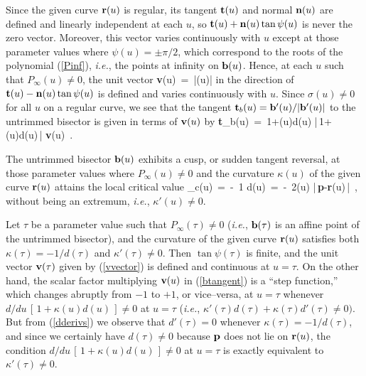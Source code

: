 Since the given curve ${\bf r}(u)$ is regular, its tangent ${\bf t}(u)$
and normal ${\bf n}(u)$ are defined and linearly independent at each $u$,
so ${\bf t}(u)+{\bf n}(u)\tan\psi(u)$ is never the zero vector. Moreover,
this vector varies continuously with $u$ except at those parameter values
where $\psi(u)=\pm\pi/2$, which correspond to the roots of the polynomial
(\ref{Pinf}), {\it i.e.}, the points at infinity on ${\bf b}(u)$. Hence,
at each $u$ such that $P_\infty(u)\not=0$, the unit vector
\be \label{vvector}
{\bf v}(u) \,=\, |\cos\psi(u)\;\!| 
\ee
in the direction of ${\bf t}(u)-{\bf n}(u)\tan\psi(u)$ is defined and
varies continuously with $u$. Since $\sigma(u)\not=0$ for all $u$ on
a regular curve, we see that the tangent ${\bf t}_b(u)={\bf b}'(u) /
|{\bf b}'(u)|$ to the untrimmed bisector is given in terms of ${\bf v}
(u)$ by
\be \label{btangent}
{\bf t}_b(u) \,=\,
{1+\kappa(u)d(u) \over |\,1+\kappa(u)d(u)\,|} \; {\bf v}(u) \,.
\ee

\begin{lma}
The untrimmed bisector ${\bf b}(u)$ exhibits a cusp, or sudden
tangent reversal, at those parameter values where $P_\infty(u)
\not=0$ and the curvature $\kappa(u)$ of the given curve ${\bf r}
(u)$ attains the local critical value
\be \label{kappacrit}
\kappa_c(u) \,=\, -\ {1 \over d(u)} \,=\,
-\ {2\cos\psi(u) \over |\,{\bf p}-{\bf r}(u)\,|} \,,
\ee
without being an extremum, {\it i.e.}, $\kappa'(u)\not=0$.
\end{lma}

\prf Let $\tau$ be a parameter value such that $P_\infty(\tau)\not
=0$ ({\it i.e.}, ${\bf b}(\tau)$ is an affine point of the untrimmed
bisector), and the curvature of the given curve ${\bf r}(u)$ satisfies
both $\kappa(\tau)=-1/d(\tau)$ and $\kappa'(\tau)\not=0$. Then $\tan
\psi(\tau)$ is finite, and the unit vector ${\bf v}(\tau)$ given by
(\ref{vvector}) is defined and continuous at $u=\tau$. On the other
hand, the scalar factor multiplying ${\bf v}(u)$ in (\ref{btangent})
is a ``step function,'' which changes abruptly from $-1$ to $+1$,
or vice--versa, at $u=\tau$ whenever $d/du\,[\,1+\kappa(u)d(u)\,]
\not=0$ at $u=\tau$ ({\it i.e.}, $\kappa'(\tau)d(\tau)+\kappa(\tau)
d'(\tau)\not=0)$. But from (\ref{dderivs}) we observe that $d'(\tau)
=0$ whenever $\kappa(\tau)=-1/d(\tau)$, and since we certainly have
$d(\tau)\not=0$ because ${\bf p}$ does not lie on ${\bf r}(u)$, the
condition $d/du\,[\,1+\kappa(u)d(u)\,]\not=0$ at $u=\tau$ is exactly
equivalent to $\kappa'(\tau)\not=0$. \QED

